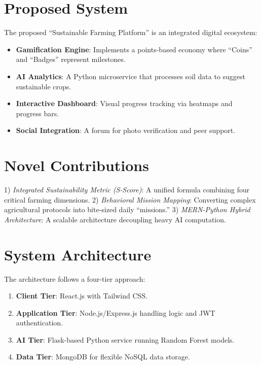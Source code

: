\documentclass[journal]{IEEEtran}
\begin{document}
\section{Proposed System}
The proposed ``Sustainable Farming Platform'' is an integrated digital ecosystem:
\begin{itemize}
    \item \textbf{Gamification Engine}: Implements a points-based economy where ``Coins'' and ``Badges'' represent milestones.
    \item \textbf{AI Analytics}: A Python microservice that processes soil data to suggest sustainable crops.
    \item \textbf{Interactive Dashboard}: Visual progress tracking via heatmaps and progress bars.
    \item \textbf{Social Integration}: A forum for photo verification and peer support.
\end{itemize}

\section{Novel Contributions}
1) \textit{Integrated Sustainability Metric (S-Score)}: A unified formula combining four critical farming dimensions. 
2) \textit{Behavioral Mission Mapping}: Converting complex agricultural protocols into bite-sized daily ``missions.'' 
3) \textit{MERN-Python Hybrid Architecture}: A scalable architecture decoupling heavy AI computation.

\section{System Architecture}
The architecture follows a four-tier approach:
\begin{enumerate}
    \item \textbf{Client Tier}: React.js with Tailwind CSS.
    \item \textbf{Application Tier}: Node.js/Express.js handling logic and JWT authentication.
    \item \textbf{AI Tier}: Flask-based Python service running Random Forest models.
    \item \textbf{Data Tier}: MongoDB for flexible NoSQL data storage.
\end{enumerate}
\end{document}

